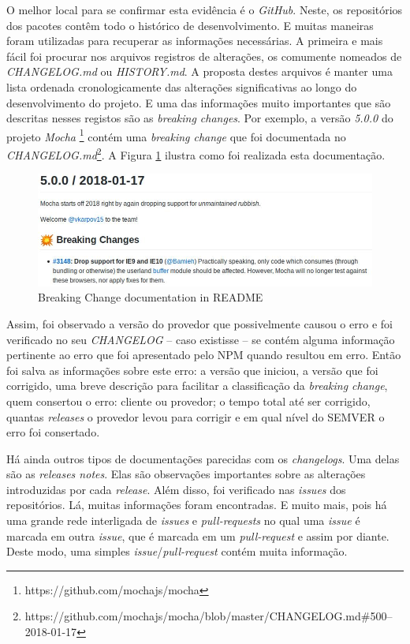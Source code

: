 O melhor local para se confirmar esta evidência é o \textit{GitHub}. Neste, os repositórios dos pacotes contêm todo o histórico de desenvolvimento. E muitas maneiras foram utilizadas para recuperar as informações necessárias. A primeira e mais fácil foi procurar nos arquivos registros de alterações, os comumente nomeados de \textit{CHANGELOG.md} ou \textit{HISTORY.md}. A proposta destes arquivos é manter uma lista ordenada cronologicamente das alterações significativas ao longo do desenvolvimento do projeto. E uma das informações muito importantes que são descritas nesses registos são as \textit{breaking changes}. Por exemplo, a versão \textit{5.0.0} do projeto \textit{Mocha} \footnote{https://github.com/mochajs/mocha} contém uma \textit{breaking change} que foi documentada no \textit{CHANGELOG.md}\footnote{https://github.com/mochajs/mocha/blob/master/CHANGELOG.md\#500--2018-01-17}. A Figura \ref{fig:bc_documentation} ilustra como foi realizada esta documentação.

\begin{figure}
    \centering
    \includegraphics[scale=0.55]{figuras/bc_documentation.jpeg}
    \caption{Breaking Change documentation in README}
    \label{fig:bc_documentation}
\end{figure}{}

Assim, foi observado a versão do provedor que possivelmente causou o erro e foi verificado no seu \textit{CHANGELOG} -- caso existisse -- se contém alguma informação pertinente ao erro que foi apresentado pelo \gls{NPM} quando resultou em erro. Então foi salva as informações sobre este erro: a versão que iniciou, a versão que foi corrigido, uma breve descrição para facilitar a classificação da \textit{breaking change}, quem consertou o erro: cliente ou provedor; o tempo total até ser corrigido, quantas \textit{releases} o provedor levou para corrigir e em qual nível do \gls{SEMVER} o erro foi consertado.

Há ainda outros tipos de documentações parecidas com os \textit{changelogs}. Uma delas são as \textit{releases notes}. Elas são observações importantes sobre as alterações introduzidas por cada \textit{release}. Além disso, foi verificado nas \textit{issues} dos repositórios. Lá, muitas informações foram encontradas. E muito mais, pois há uma grande rede interligada de \textit{issues} e \textit{pull-requests} no qual uma \textit{issue} é marcada em outra \textit{issue}, que é marcada em um \textit{pull-request} e assim por diante. Deste modo, uma simples \textit{issue}/\textit{pull-request} contém muita informação.

